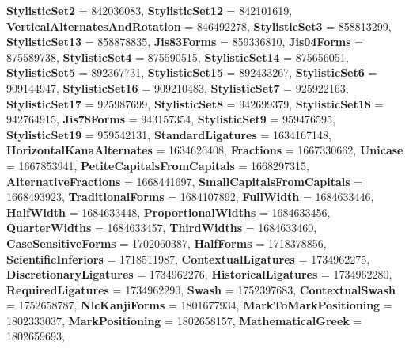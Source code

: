\begin{DoxyCompactItemize}
{\bfseries Stylistic\+Set2} = 842036083, 
{\bfseries Stylistic\+Set12} = 842101619, 
\newline
{\bfseries Vertical\+Alternates\+And\+Rotation} = 846492278, 
{\bfseries Stylistic\+Set3} = 858813299, 
{\bfseries Stylistic\+Set13} = 858878835, 
{\bfseries Jis83\+Forms} = 859336810, 
\newline
{\bfseries Jis04\+Forms} = 875589738, 
{\bfseries Stylistic\+Set4} = 875590515, 
{\bfseries Stylistic\+Set14} = 875656051, 
{\bfseries Stylistic\+Set5} = 892367731, 
\newline
{\bfseries Stylistic\+Set15} = 892433267, 
{\bfseries Stylistic\+Set6} = 909144947, 
{\bfseries Stylistic\+Set16} = 909210483, 
{\bfseries Stylistic\+Set7} = 925922163, 
\newline
{\bfseries Stylistic\+Set17} = 925987699, 
{\bfseries Stylistic\+Set8} = 942699379, 
{\bfseries Stylistic\+Set18} = 942764915, 
{\bfseries Jis78\+Forms} = 943157354, 
\newline
{\bfseries Stylistic\+Set9} = 959476595, 
{\bfseries Stylistic\+Set19} = 959542131, 
{\bfseries Standard\+Ligatures} = 1634167148, 
{\bfseries Horizontal\+Kana\+Alternates} = 1634626408, 
\newline
{\bfseries Fractions} = 1667330662, 
{\bfseries Unicase} = 1667853941, 
{\bfseries Petite\+Capitals\+From\+Capitals} = 1668297315, 
{\bfseries Alternative\+Fractions} = 1668441697, 
\newline
{\bfseries Small\+Capitals\+From\+Capitals} = 1668493923, 
{\bfseries Traditional\+Forms} = 1684107892, 
{\bfseries Full\+Width} = 1684633446, 
{\bfseries Half\+Width} = 1684633448, 
\newline
{\bfseries Proportional\+Widths} = 1684633456, 
{\bfseries Quarter\+Widths} = 1684633457, 
{\bfseries Third\+Widths} = 1684633460, 
{\bfseries Case\+Sensitive\+Forms} = 1702060387, 
\newline
{\bfseries Half\+Forms} = 1718378856, 
{\bfseries Scientific\+Inferiors} = 1718511987, 
{\bfseries Contextual\+Ligatures} = 1734962275, 
{\bfseries Discretionary\+Ligatures} = 1734962276, 
\newline
{\bfseries Historical\+Ligatures} = 1734962280, 
{\bfseries Required\+Ligatures} = 1734962290, 
{\bfseries Swash} = 1752397683, 
{\bfseries Contextual\+Swash} = 1752658787, 
\newline
{\bfseries Nlc\+Kanji\+Forms} = 1801677934, 
{\bfseries Mark\+To\+Mark\+Positioning} = 1802333037, 
{\bfseries Mark\+Positioning} = 1802658157, 
{\bfseries Mathematical\+Greek} = 1802659693, 

\end{DoxyCompactItemize}
